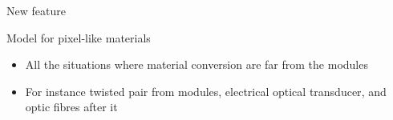 \documentclass[pdftex, 11pt]{beamer}
\begin{document}
\begin{frame}{New feature}
  \begin{block}{Model for \alert{pixel-like} materials}
    \begin{itemize}
    \item All the situations where material \alert{conversion} are \alert{far} from the modules
      \pause
    \item For instance \alert{twisted pair} from modules, electrical optical \alert{transducer}, and \alert{optic fibres} after it
    \end{itemize}
  \end{block}
  \begin{center}

\end{center}
\end{frame}
\end{document}
